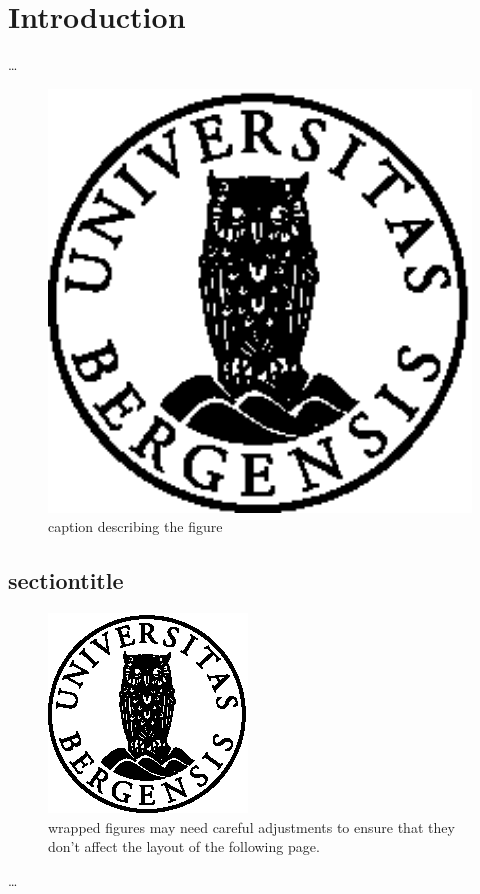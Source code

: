 \chapter{Introduction}
\label{chap:intro}
\ldots

\begin{figure}[htbp]
\centering
	\includegraphics[width=12cm]{figures/uglo} 
	\caption{caption describing the figure}
	\label{fig:1}
\end{figure}
\section{sectiontitle}
\label{sec:i1}
\lipsum[1]
\begin{figure}
    \centering
    \includegraphics[width=.47\textwidth]{figures/uglo.eps}
    \caption{wrapped figures may need careful adjustments to ensure that they don't affect the layout of the following page.}
    \label{fig:wf}
\end{figure}
\lipsum[1]

\ldots
